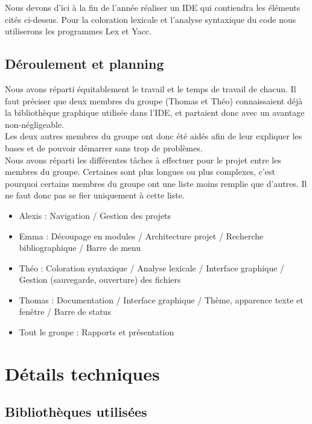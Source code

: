 \documentclass[a4paper,12pt]{article}
\begin{document}
	Nous devons d'ici à la fin de l'année réaliser un IDE qui contiendra les éléments cités ci-dessus. Pour la coloration lexicale et l'analyse syntaxique du code nous utiliserons les programmes Lex et Yacc.
	
	\subsection{Déroulement et planning}
	
	Nous avons réparti équitablement le travail et le temps de travail de chacun. Il faut préciser que deux membres du groupe (Thomas et Théo) connaissaient déjà la bibliothèque graphique utilisée dans l'IDE, et partaient donc avec un avantage non-négligeable. \\
	Les deux autres membres du groupe ont donc été aidés afin de leur expliquer les bases et de pouvoir démarrer sans trop de problèmes.\\
	
	Nous avons réparti les différentes tâches à effectuer pour le projet entre les membres du groupe. Certaines sont plus longues ou plus complexes, c'est pourquoi certains membres du groupe ont une liste moins remplie que d'autres. Il ne faut donc pas se fier uniquement à cette liste.\\
	
	\begin{itemize}
		\item Alexis : Navigation / Gestion des projets
		\item Emma : Découpage en modules / Architecture projet / Recherche bibliographique / Barre de menu
		\item Théo : Coloration syntaxique / Analyse lexicale / Interface graphique / Gestion (sauvegarde, ouverture) des fichiers
		\item Thomas : Documentation / Interface graphique / Thème, apparence texte et fenêtre / Barre de status
		\item Tout le groupe : Rapports et présentation 
	\end{itemize}
	
\section{Détails techniques}

	\subsection{Bibliothèques utilisées}
	
\end{document}
